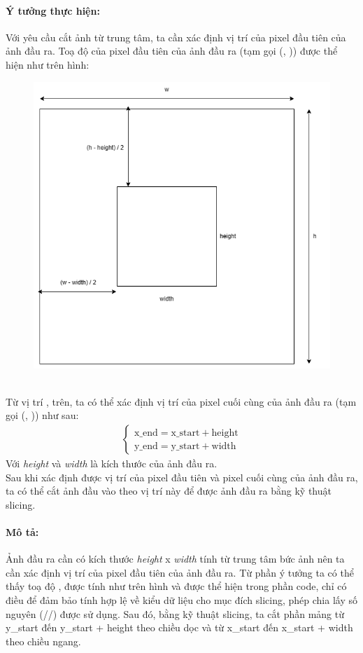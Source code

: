 \documentclass{article}
\begin{document}
\paragraph{Ý tưởng thực hiện:} Với yêu cầu cắt ảnh từ trung tâm, ta cần xác định vị trí của pixel đầu tiên của ảnh đầu ra. Toạ độ của pixel đầu tiên của ảnh đầu ra (tạm gọi (, )) được thể hiện như trên hình:
\begin{figure}[!ht]
\includegraphics[width = .5\textwidth]{image/square_center.png}
\end{figure} \\
Từ vị trí ,  trên, ta có thể xác định vị trí của pixel cuối cùng của ảnh đầu ra (tạm gọi (, )) như sau:
\begin{align*}
  \begin{cases}
    \text{x\_{end}} = \text{x\_{start}} + \text{height} \\
    \text{y\_{end}} = \text{y\_{start}} + \text{width}
  \end{cases}
\end{align*}
Với \textit{height} và \textit{width} là kích thước của ảnh đầu ra. \\
Sau khi xác định được vị trí của pixel đầu tiên và pixel cuối cùng của ảnh đầu ra, ta có thể cắt ảnh đầu vào theo vị trí này để được ảnh đầu ra bằng kỹ thuật slicing. 

\paragraph{Mô tả:} Ảnh đầu ra cần có kích thước \textit{height} x \textit{width} tính từ trung tâm bức ảnh  nên ta cần xác định vị trí của pixel đầu tiên của ảnh đầu ra. Từ phần ý tưởng ta có thể thấy toạ độ ,  được tính như trên hình và được thể hiện trong phần code, chỉ có điều để đảm bảo tính hợp lệ về kiểu dữ liệu cho mục đích slicing, phép chia lấy số nguyên (//) được sử dụng. Sau đó, bằng kỹ thuật slicing, ta cắt phần mảng từ y\_start đến y\_start + height theo chiều dọc và từ x\_start đến x\_start + width theo chiều ngang.
\end{document}
